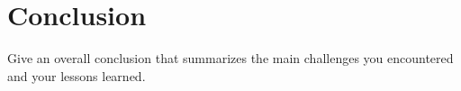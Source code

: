 \documentclass{report}
\begin{document}
\section{Conclusion}

Give an overall conclusion that summarizes the main challenges you encountered and your lessons learned.



\end{document}
